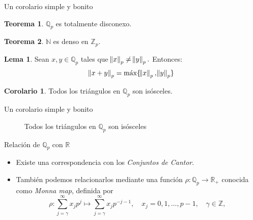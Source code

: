 \documentclass{beamer}
\newcommand{\bb}[1]{\mathbb{#1}}
\theoremstyle{definition}
\numberwithin{equation}{section}
\newcommand{\orangee}[1]{\textcolor{thColor}{#1}}
\newtheorem{thh}{\orangee{Teorema}}
\newtheorem{lm}{\orangee{Lema}}
\newtheorem{crr}{\orangee{Corolario}}
\newcommand{\N}{\mathbb{N}}
\newcommand{\R}{\mathbb{R}}
\newcommand{\Qp}{\mathbb{Q}_p}
\newcommand{\Zp}{\mathbb{Z}_p}
\newcommand{\pnorm}[1]{\|#1\|_p}
\newcommand{\maxx}[1]{\text{m\'ax} #1}
\begin{document}
\begin{frame}{Un corolario simple y bonito}
	\begin{thh}
		$\Qp$ es totalmente disconexo.
	\end{thh}
	\begin{thh}
		$\N$ es denso en $\Zp$.
	\end{thh}
	\begin{lm}
		Sean $x, y \in \bb{Q}_p$ tales que $\norm{x}_p \neq \norm{y}_p.$ Entonces:
		$$\norm{x+y}_p=\maxx\{\norm{x}_p,\norm{y}_p\}$$
	\end{lm}
	\begin{crr}
		Todos los triángulos en $\Qp$ son isósceles.  
	\end{crr}
\end{frame}
\begin{frame}{Un corolario simple y bonito}

\begin{figure}
	\centering
	\caption{Todos los triángulos en $\bb{Q}_p$ son isósceles}
	\label{fig:1}
\end{figure}
\end{frame}
\begin{frame}{Relación de $\Qp$ con $\R$}
\begin{itemize}
	\item Existe una correspondencia con los \textit{Conjuntos de Cantor}.
	\item También podemos relacionarlos mediante una función $\rho\colon\Qp\to\R_{+}$ conocida como \textit{Monna map}, definida por
	\begin{equation}\label{Monna}
	\rho: \sum_{j=\gamma}^{\infty} x_{j} p^{j} \mapsto \sum_{j=\gamma}^{\infty} x_{j} p^{-j-1}, \quad x_{j}=0,1, \ldots, p-1, \quad \gamma \in \mathbb{Z},
	\end{equation}
\end{itemize}
\end{frame}
\end{document}
